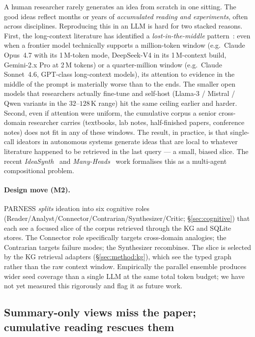 \documentclass{article}
\newcommand{\parness}{\textsf{PARNESS}}
\begin{document}
A human researcher rarely generates an idea from scratch in one sitting.
The good ideas reflect months or years of \emph{accumulated reading and
experiments}, often across disciplines. Reproducing this in an LLM is
hard for two stacked reasons. First, the long-context literature has
identified a \emph{lost-in-the-middle} pattern~\cite{lostmiddle}: even
when a frontier model technically supports a million-token window
(e.g.\ Claude Opus~4.7 with its 1\,M-token mode, DeepSeek-V4 in its
1\,M-context build, Gemini-2.x Pro at 2\,M tokens) or a quarter-million
window (e.g.\ Claude Sonnet~4.6, GPT-class long-context models), its
attention to evidence in the middle of the prompt is materially worse
than to the ends. The smaller open models that researchers actually
fine-tune and self-host (Llama-3 / Mistral / Qwen variants in the
$32$--$128$\,K range) hit the same ceiling earlier and harder. Second,
even if attention were uniform, the cumulative corpus a senior
cross-domain researcher carries (textbooks, lab notes, half-finished
papers, conference notes) does not fit in any of these windows. The
result, in practice, is that single-call ideators in autonomous
systems generate ideas that are local to whatever literature happened
to be retrieved in the last query --- a small, biased slice. The
recent \emph{IdeaSynth}~\cite{ideasynth} and
\emph{Many-Heads}~\cite{manyheads} work formalises this as a
multi-agent compositional problem.

\paragraph{Design move (M2).} \parness{} \emph{splits} ideation into
six cognitive roles
(Reader/Analyst/Connector/Contrarian/Synthesizer/Critic; \S\ref{sec:cognitive})
that each see a focused slice of the corpus retrieved through the KG and
SQLite stores. The Connector role specifically targets cross-domain
analogies; the Contrarian targets failure modes; the Synthesizer
recombines. The slice is selected by the KG retrieval adapters
(\S\ref{sec:method:kg}), which see the typed graph rather than the raw
context window. Empirically the parallel ensemble produces wider seed
coverage than a single LLM at the same total token budget; we have not
yet measured this rigorously and flag it as future work.

\subsection{Summary-only views miss the paper; cumulative reading rescues them}
\label{sec:m3:fulltext}
\end{document}
